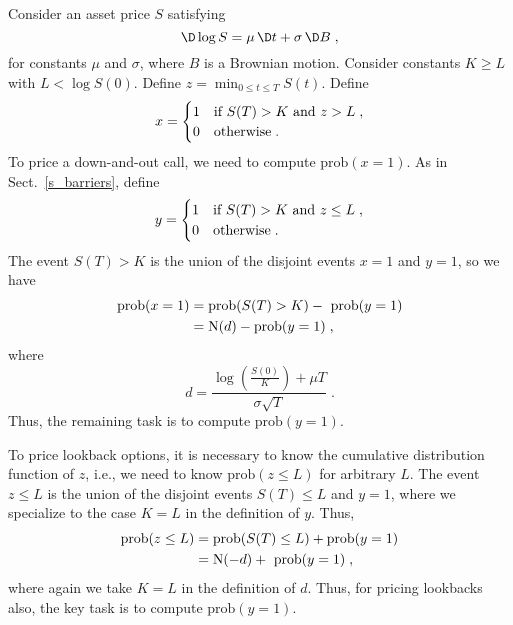Consider an asset price $S$ satisfying
$$\D\log S = \mu\,\D t+\sigma\,\D B\; ,$$
for constants $\mu$ and $\sigma$, where $B$ is a Brownian motion.  Consider constants $K \geq L$ with $L< \log S(0)$.  Define $z = \min_{0 \leq t \leq T} S(t)$.  Define
$$x = \begin{cases} 1 & \text{if $S(T)> K$ and $z> L$}\;,\\
0 & \text{otherwise\;.} \end{cases}$$
To price a down-and-out call, we need to compute $\text{prob}(x=1)$.
As in Sect.~\ref{s_barriers}, define
$$y = \begin{cases} 1 & \text{if $S(T)> K$ and $z \leq L$}\;,\\
0 & \text{otherwise\;.} \end{cases}$$
The event $S(T)>K$ is the union of the disjoint events $x=1$ and $y=1$, so we have
\begin{align*}
\text{prob}(x=1) &= \text{prob}(S(T)>K) - \text{ prob}(y=1)\\
&= \operatorname{N}(d) - \text{prob}(y=1)\;,
\end{align*}
where
\begin{equation}\label{appendixc100}
d = \frac{\log \left(\frac{S(0)}{K}\right)+ \mu T}{\sigma\sqrt{T}}\;.
\end{equation}
Thus, the remaining task is to compute $\text{prob}(y=1)$.

To price lookback options, it is necessary to know the cumulative distribution function of $z$, i.e., we need to know $\text{prob}(z \leq L)$ for arbitrary $L$.  
The event $z \leq L$ is the union of the disjoint events $S(T) \leq L$ and $y=1$, where we specialize to the case $K=L$ in the definition of $y$.  Thus,
\begin{align*}
\text{prob}(z \leq L) &= \text{prob}(S(T)\leq L) + \text{prob}(y=1)\\
&= \operatorname{N}(-d) + \text{ prob}(y=1)\;,
\end{align*}
where again we take $K = L$ in the definition of $d$.  Thus, for pricing lookbacks also, the key task is to compute $\text{prob}(y=1)$.


